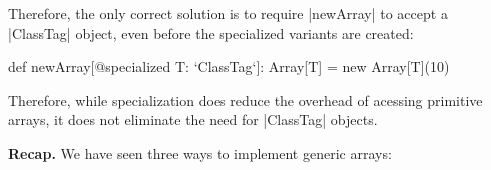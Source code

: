 Therefore, the only correct solution is to require |newArray| to accept a |ClassTag| object, even before the specialized variants are created:

\begin{lstlisting-nobreak}
 def newArray[@specialized T: `ClassTag`]: Array[T] =
   new Array[T](10)
\end{lstlisting-nobreak}

Therefore, while specialization does reduce the overhead of acessing primitive arrays, it does not eliminate the need for |ClassTag| objects.



\textbf{Recap.} We have seen three ways to implement generic arrays:

